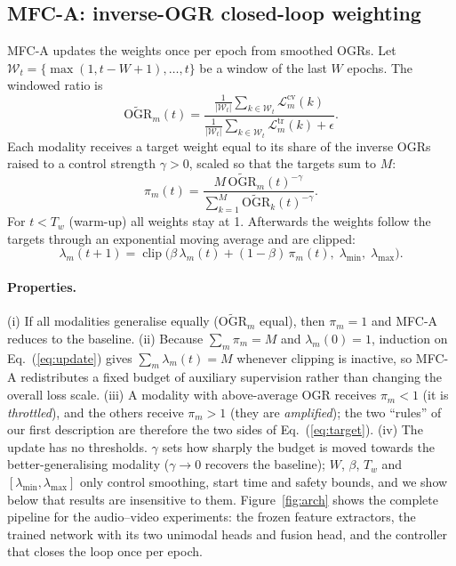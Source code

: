 \documentclass[fleqn,10pt]{wlscirep}
\newcommand{\Ltr}{\mathcal{L}^{\mathrm{tr}}}
\newcommand{\Lcv}{\mathcal{L}^{\mathrm{cv}}}
\newcommand{\OGR}{\mathrm{OGR}}
\begin{document}
\subsection*{MFC-A: inverse-OGR closed-loop weighting}
MFC-A updates the weights once per epoch from smoothed OGRs. Let $\mathcal{W}_t=\{\max(1,t-W+1),\dots,t\}$ be a window of the last $W$ epochs. The windowed ratio is
\begin{equation}
\widetilde{\OGR}_m(t)=\frac{\frac{1}{|\mathcal{W}_t|}\sum_{k\in\mathcal{W}_t}\Lcv_m(k)}{\frac{1}{|\mathcal{W}_t|}\sum_{k\in\mathcal{W}_t}\Ltr_m(k)+\epsilon}.
\label{eq:window}
\end{equation}
Each modality receives a target weight equal to its share of the inverse OGRs raised to a control strength $\gamma>0$, scaled so that the targets sum to $M$:
\begin{equation}
\pi_m(t)=\frac{M\,\widetilde{\OGR}_m(t)^{-\gamma}}{\sum_{k=1}^{M}\widetilde{\OGR}_k(t)^{-\gamma}}.
\label{eq:target}
\end{equation}
For $t<T_w$ (warm-up) all weights stay at 1. Afterwards the weights follow the targets through an exponential moving average and are clipped:
\begin{equation}
\lambda_m(t+1)=\operatorname{clip}\!\big(\beta\,\lambda_m(t)+(1-\beta)\,\pi_m(t),\;\lambda_{\min},\;\lambda_{\max}\big).
\label{eq:update}
\end{equation}
\paragraph{Properties.} (i) If all modalities generalise equally ($\widetilde{\OGR}_m$ equal), then $\pi_m=1$ and MFC-A reduces to the baseline. (ii) Because $\sum_m\pi_m=M$ and $\lambda_m(0)=1$, induction on Eq.~(\ref{eq:update}) gives $\sum_m\lambda_m(t)=M$ whenever clipping is inactive, so MFC-A redistributes a fixed budget of auxiliary supervision rather than changing the overall loss scale. (iii) A modality with above-average OGR receives $\pi_m<1$ (it is \emph{throttled}), and the others receive $\pi_m>1$ (they are \emph{amplified}); the two ``rules'' of our first description are therefore the two sides of Eq.~(\ref{eq:target}). (iv) The update has no thresholds. $\gamma$ sets how sharply the budget is moved towards the better-generalising modality ($\gamma\to0$ recovers the baseline); $W$, $\beta$, $T_w$ and $[\lambda_{\min},\lambda_{\max}]$ only control smoothing, start time and safety bounds, and we show below that results are insensitive to them. Figure~\ref{fig:arch} shows the complete pipeline for the audio--video experiments: the frozen feature extractors, the trained network with its two unimodal heads and fusion head, and the controller that closes the loop once per epoch.
\end{document}
